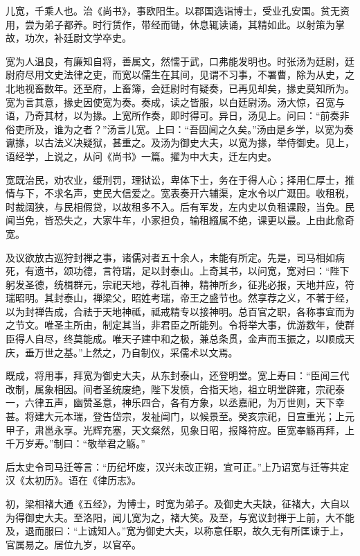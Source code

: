 \documentclass[]{article}
\begin{document}
儿宽，千乘人也。治《尚书》，事欧阳生。以郡国选诣博士，受业孔安国。贫无资用，尝为弟子都养。时行赁作，带经而锄，休息辄读诵，其精如此。以射策为掌故，功次，补廷尉文学卒史。

宽为人温良，有廉知自将，善属文，然懦于武，口弗能发明也。时张汤为廷尉，廷尉府尽用文史法律之吏，而宽以儒生在其间，见谓不习事，不署曹，除为从史，之北地视畜数年。还至府，上畜簿，会廷尉时有疑奏，已再见却矣，掾史莫知所为。宽为言其意，掾史因使宽为奏。奏成，读之皆服，以白廷尉汤。汤大惊，召宽与语，乃奇其材，以为掾。上宽所作奏，即时得可。异日，汤见上。问曰：``前奏非俗吏所及，谁为之者？''汤言儿宽。上曰：``吾固闻之久矣。''汤由是乡学，以宽为奏谳掾，以古法义决疑狱，甚重之。及汤为御史大夫，以宽为掾，举侍御史。见上，语经学，上说之，从问《尚书》一篇。擢为中大夫，迁左内史。

宽既治民，劝农业，缓刑罚，理狱讼，卑体下士，务在于得人心；择用仁厚士，推情与下，不求名声，吏民大信爱之。宽表奏开六辅渠，定水令以广溉田。收租税，时裁阔狭，与民相假贷，以故租多不入。后有军发，左内史以负租课殿，当免。民闻当免，皆恐失之，大家牛车，小家担负，输租繦属不绝，课更以最。上由此愈奇宽。

及议欲放古巡狩封禅之事，诸儒对者五十余人，未能有所定。先是，司马相如病死，有遗书，颂功德，言符瑞，足以封泰山。上奇其书，以问宽，宽对曰：``陛下躬发圣德，统楫群元，宗祀天地，荐礼百神，精神所乡，征兆必报，天地并应，符瑞昭明。其封泰山，禅梁父，昭姓考瑞，帝王之盛节也。然享荐之义，不著于经，以为封禅告成，合祛于天地神祗，祗戒精专以接神明。总百官之职，各称事宜而为之节文。唯圣主所由，制定其当，非君臣之所能列。令将举大事，优游数年，使群臣得人自尽，终莫能成。唯天子建中和之极，兼总条贯，金声而玉振之，以顺成天庆，垂万世之基。''上然之，乃自制仪，采儒术以文焉。

既成，将用事，拜宽为御史大夫，从东封泰山，还登明堂。宽上寿曰：``臣闻三代改制，属象相因。间者圣统废绝，陛下发愤，合指天地，祖立明堂辟雍，宗祀泰一，六律五声，幽赞圣意，神乐四合，各有方象，以丞嘉祀，为万世则，天下幸甚。将建大元本瑞，登告岱宗，发祉闿门，以候景至。癸亥宗祀，日宣重光；上元甲子，肃邕永享。光辉充塞，天文粲然，见象日昭，报降符应。臣宽奉觞再拜，上千万岁寿。''制曰：``敬举君之觞。''

后太史令司马迁等言：``历纪坏废，汉兴未改正朔，宜可正。''上乃诏宽与迁等共定汉《太初历》。语在《律历志》。

初，梁相褚大通《五经》，为博士，时宽为弟子。及御史大夫缺，征褚大，大自以为得御史大夫。至洛阳，闻儿宽为之，褚大笑。及至，与宽议封禅于上前，大不能及，退而服曰：``上诚知人。''宽为御史大夫，以称意任职，故久无有所匡谏于上，官属易之。居位九岁，以官卒。
\end{document}
